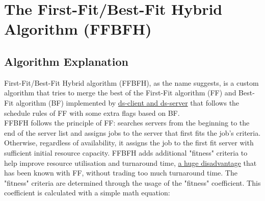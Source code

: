 \documentclass[a4paper]{article} %
\begin{document}
\section{The First-Fit/Best-Fit Hybrid Algorithm (FFBFH)}
\label{sec:section3}
\subsection{Algorithm Explanation}
First-Fit/Best-Fit Hybrid algorithm (FFBFH), as the name suggests, is a custom algorithm that tries to merge the best of the First-Fit algorithm (FF) and Best-Fit algorithm (BF) implemented by \href{https://github.com/distsys-MQ/ds-sim}{ds-client and ds-server} \cite{ds-sim} that follows the schedule rules of FF with some extra flags based on BF.\\
FFBFH follows the principle of FF: searches servers from the beginning to the end of the server list and assigns jobs to the server that first fits the job's criteria. Otherwise, regardless of availability, it assigns the job to the first fit server with sufficient initial resource capacity. FFBFH adds additional "fitness" criteria to help improve resource utilisation and turnaround time, \href{https://www.tutorialspoint.com/operating_system/os_memory_allocation_qa2.htm}{a huge disadvantage} \cite{mem-allocation} that has been known with FF, without trading too much turnaround time. The "fitness" criteria are determined through the usage of the "fitness" coefficient. This coefficient is calculated with a simple math equation:
\end{document}
